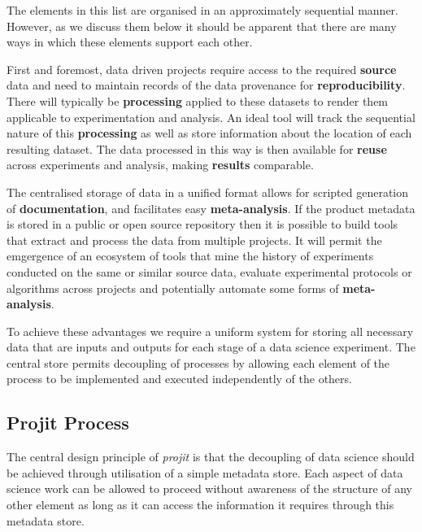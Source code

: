 \documentclass[sigconf]{acmart}
\begin{document}
The elements in this list are organised in an approximately sequential manner. 
However, as we discuss them below it should be apparent that there are many ways 
in which these elements support each other.

First and foremost, data driven projects require access to the required \textbf{source} data 
and need to maintain records of the data provenance for \textbf{reproducibility}. 
There will typically be \textbf{processing} applied to these datasets to 
render them applicable to experimentation and analysis. An ideal tool will track the 
sequential nature of this \textbf{processing} as well as store information about 
the location of each resulting dataset. The data processed in this way is then 
available for \textbf{reuse} across experiments and analysis,
making \textbf{results} comparable.

The centralised storage of data in a unified format allows for scripted generation 
of \textbf{documentation}, and facilitates easy \textbf{meta-analysis}. If the 
product metadata is stored in a public or open source repository then it is 
possible to build tools that extract and process the data from multiple projects. It
will permit the emgergence of an ecosystem of tools that mine the history of 
experiments conducted on the same or similar source data, evaluate experimental 
protocols or algorithms across projects and potentially
automate some forms of \textbf{meta-analysis}.
 
To achieve these advantages we require a uniform system for storing all necessary 
data that are inputs and outputs for each stage of a data science experiment. 
The central store permits decoupling of processes by allowing each
element of the process to be implemented and executed independently of the others.

\subsection{Projit Process}

The central design principle of \textit{projit} is that the decoupling of data science 
should be achieved through utilisation of a simple metadata store. Each aspect of 
data science work can be allowed to proceed without awareness of the structure of 
any other element as long as it can access the information it requires through this
metadata store.
\end{document}

